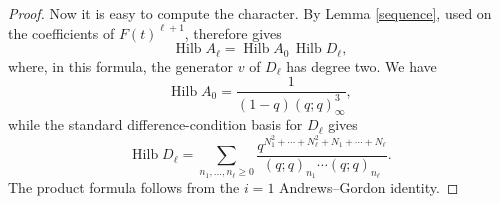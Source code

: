 \documentclass[11pt]{amsart}
\newtheorem{corollary}[theorem]{Corollary}
\theoremstyle{definition}
\theoremstyle{remark}
\newcommand{\g}{\mathfrak g}
\newcommand{\vac}{\mathbf1}
\newcommand{\J}{J_\infty}
\newcommand{\spalg}{\mathfrak{sp}}
\DeclareMathOperator{\gr}{gr}
\begin{document}
\begin{proof}
\medskip
Now it is easy to compute the character. By Lemma \ref{sequence}, used on the coefficients of $F(t)^{\ell+1}$, therefore gives
\[
 \operatorname{Hilb}A_\ell
 =
 \operatorname{Hilb}A_0\,
 \operatorname{Hilb}D_\ell,
\]
where, in this formula, the generator $v$ of $D_\ell$
has degree two. We have
\[
 \operatorname{Hilb}A_0
 =\frac{1}{(1-q)(q;q)_\infty^3},
\]
while the standard difference-condition basis for $D_\ell$
gives \cite{CLM2}
\[
 \operatorname{Hilb}D_\ell
 =
 \sum_{n_1,\ldots,n_\ell\ge0}
 \frac{
 q^{N_1^2+\cdots+N_\ell^2+N_1+\cdots+N_\ell}
 }{
 (q;q)_{n_1}\cdots(q;q)_{n_\ell}
 }.
\]
The product formula follows from the $i=1$
Andrews--Gordon identity.
\end{proof}

\end{document}
